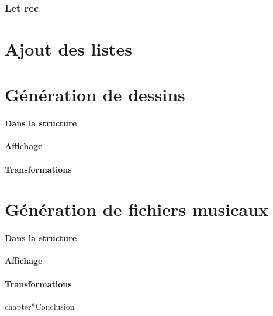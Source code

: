 \documentclass{report}
\begin{document}
\section{Let rec}

\part{Ajout des listes}

\part{Génération de dessins}
\subsection{Dans la structure}
\subsection{Affichage}
\subsection{Transformations}

\part{Génération de fichiers musicaux}
\subsection{Dans la structure}
\subsection{Affichage}
\subsection{Transformations}

chapter*{Conclusion}
\end{document}
